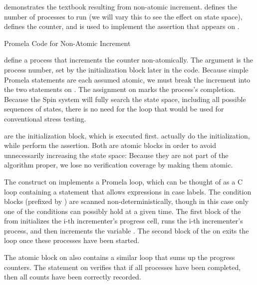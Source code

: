 \begin{fcvref}
demonstrates the textbook 
resulting from non-atomic increment.
 defines the number of processes to run (we will vary this
to see the effect on state space),  defines the counter,
and  is used to implement the assertion that appears on
.

\begin{listing}

\caption{Promela Code for Non-Atomic Increment}
\label{lst:formal:Promela Code for Non-Atomic Increment}
\end{listing}

 define a process that increments
the counter non-atomically.
The argument  is the process number, set by the initialization
block later in the code.
Because simple Promela statements are each assumed atomic, we must
break the increment into the two statements on
.
The assignment on  marks the process's completion.
Because the Spin system will fully search the state space, including
all possible sequences of states, there is no need for the loop
that would be used for conventional stress testing.

 are the initialization block,
which is executed first.
 actually do the initialization,
while 
perform the assertion.
Both are atomic blocks in order to avoid unnecessarily increasing
the state space:
Because they are not part of the algorithm proper,
we lose no verification coverage by making them atomic.

The  construct on 
implements a Promela loop,
which can be thought of as a C  loop containing a
 statement that allows expressions in case labels.
The condition blocks (prefixed by \co{::})
are scanned non-deterministically,
though in this case only one of the conditions can possibly hold at a given
time.
The first block of the  from
initializes the i-th
incrementer's progress cell, runs the i-th incrementer's process, and
then increments the variable .
The second block of the  on
 exits the loop once
these processes have been started.

The atomic block on  also contains
a similar 
loop that sums up the progress counters.
The  statement on  verifies that
if all processes
have been completed, then all counts have been correctly recorded.
\end{fcvref}

